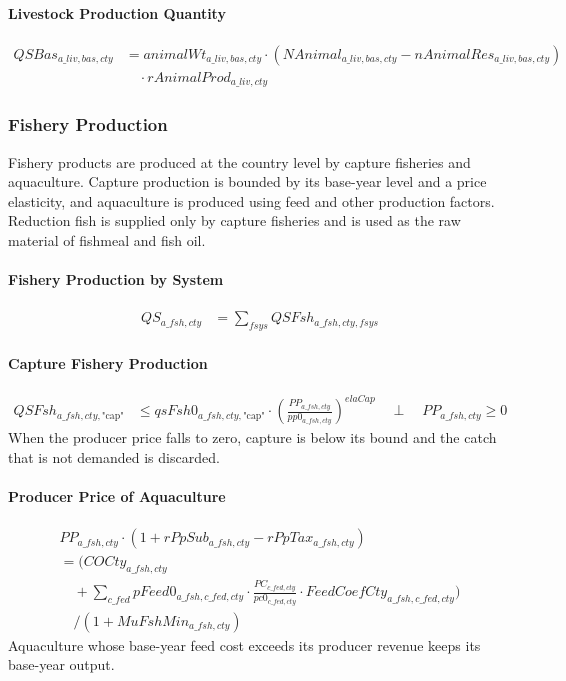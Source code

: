 \paragraph{Livestock Production Quantity}
\begin{align}
  QSBas_{a\_liv,bas,cty}
  &= animalWt_{a\_liv,bas,cty}
     \cdot
     (
       NAnimal_{a\_liv,bas,cty}
       - nAnimalRes_{a\_liv,bas,cty}
     )
     \nonumber\\[-0.3em]
  &\quad
     \cdot
     rAnimalProd_{a\_liv,cty}
  \tag{NAnimalEq}\label{eq:NAnimalEq}
\end{align}

\subsubsection{Fishery Production}

Fishery products are produced at the country level by capture fisheries and aquaculture.
Capture production is bounded by its base-year level and a price elasticity, and aquaculture is produced using feed and other production factors.
Reduction fish is supplied only by capture fisheries and is used as the raw material of fishmeal and fish oil.

\paragraph{Fishery Production by System}
\begin{align}
  QS_{a\_fsh,cty}
  &= \sum_{fsys} QSFsh_{a\_fsh,cty,fsys}
  \tag{QSFshEq}\label{eq:QSFshEq}
\end{align}

\paragraph{Capture Fishery Production}
\begin{align}
  QSFsh_{a\_fsh,cty,\text{"cap"}}
  &\le qsFsh0_{a\_fsh,cty,\text{"cap"}}
     \cdot\left(\frac{PP_{a\_fsh,cty}}{pp0_{a\_fsh,cty}}\right)^{elaCap}
  \quad\perp\quad PP_{a\_fsh,cty}\ge 0
  \tag{FshCapEq}\label{eq:FshCapEq}
\end{align}
When the producer price falls to zero, capture is below its bound and the catch that is not demanded is discarded.

\paragraph{Producer Price of Aquaculture}
\begin{multline}
  PP_{a\_fsh,cty}\cdot(1+rPpSub_{a\_fsh,cty}-rPpTax_{a\_fsh,cty}) \\
  = \Biggl(COCty_{a\_fsh,cty}
     \\[-0.3em]
  \quad + \sum_{c\_fed}pFeed0_{a\_fsh,c\_fed,cty}
       \cdot\frac{PC_{c\_fed,cty}}{pc0_{c\_fed,cty}}\cdot
       FeedCoefCty_{a\_fsh,c\_fed,cty}\Biggr)
     \\[-0.3em]
  \quad / (1+MuFshMin_{a\_fsh,cty})
  \tag{FshZeroProfitEq}\label{eq:FshZeroProfitEq}
\end{multline}
Aquaculture whose base-year feed cost exceeds its producer revenue keeps its base-year output.

